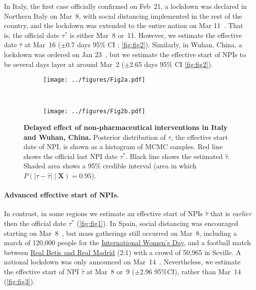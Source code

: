 \documentclass[12pt]{extarticle}
\let\vec\mathbf
\begin{document}
In Italy, the first case officially confirmed on Feb~21, a lockdown was declared in Northern Italy on Mar~8, with social distancing implemented in the rest of the country, and the lockdown was extended to the entire nation on Mar 11~\citep{Gatto2020}.
That is, the official date $\tau^*$ is either Mar~8 or~11.
However, we estimate the effective date $\hat{\tau}$ at Mar~16 ($\pm$0.7 days 95\% CI ; \autoref{fig:fig2}).
Similarly, in Wuhan, China, a lockdown was ordered on Jan 23~\citep{Li2020}, but we estimate  the effective start of NPIs to be several days layer at around Mar~2 ($\pm$2.65 days 95\% CI \autoref{fig:fig2}).


\begin{figure}[h]
    \centering
    \begin{subfigure}{0.45\textwidth}
        \texttt{[image: ../figures/Fig2a.pdf]}
    \end{subfigure}
  	~
    \begin{subfigure}{0.45\textwidth}
        \texttt{[image: ../figures/Fig2b.pdf]}
    \end{subfigure}
    \caption{
	\textbf{Delayed effect of non-pharmaceutical interventions in Italy and Wuhan, China.}
    Posterior distribution of $\tau$, the effective start date of NPI, is shown as a histogram of MCMC samples. Red line shows the official last NPI date $\tau^*$. Black line shows the estimated $\hat{\tau}$. Shaded area shows a 95\% credible interval (area in which $P(|\tau - \hat{\tau}| \mid \vec{X}) = 0.95$). 
    }
    \label{fig:fig2}
\end{figure}



\paragraph*{Advanced effective start of NPIs.}
In contrast, in some regions we estimate an effective start of NPIs $\hat{\tau}$ that is \emph{earlier} then the official date $\tau^*$ (\autoref{fig:fig1}).
In Spain, social distancing was encouraged starting on Mar~8~\citep{Flaxman2020}, but mass gatherings still occurred on Mar~8, including a march of 120,000 people for the \href{https://www.nytimes.com/2020/03/13/world/europe/spain-coronavirus-emergency.html}{International Women's Day}, and a  football match between \href{https://www.espn.com/soccer/match?gameId=550350}{Real Betis and Real Madrid} (2:1) with a crowd of 50,965 in Seville.
A national lockdown was only announced on Mar~14~\citep{Flaxman2020}.
Nevertheless, we estimate the effective start of NPI $\hat{\tau}$ at Mar~8 or~9 ($\pm$2.96 95\%CI), rather than Mar~14 (\autoref{fig:fig3}).
\end{document}

